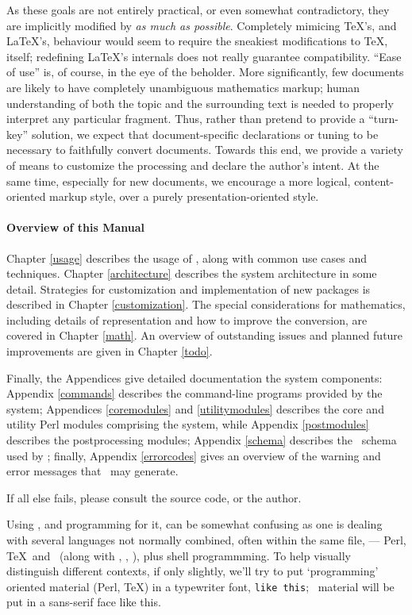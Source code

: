 \documentclass{book}
\begin{document}
As these goals are not entirely practical, or even somewhat contradictory,
they are implicitly modified by \emph{as much as possible}.
Completely mimicing \TeX's, and \LaTeX's, behaviour would seem to require the
sneakiest modifications to \TeX, itself; redefining \LaTeX's internals does 
not really guarantee compatibility. ``Ease of use'' is, of course, in the eye of the beholder.
More significantly, few documents are likely to have completely unambiguous
mathematics markup; human understanding of both the topic and the surrounding 
text is needed to properly interpret any particular fragment.
Thus, rather than pretend to provide a ``turn-key'' solution,
we expect that document-specific declarations or tuning to be necessary
to faithfully convert documents.  Towards this end, we provide a variety
of means to customize the processing and declare the author's intent.
At the same time, especially for new documents, we encourage a more logical, 
content-oriented markup style, over a purely presentation-oriented style.

\paragraph[Overview]{Overview of this Manual}
Chapter \ref{usage} describes the usage of \LaTeXML, along with
common use cases and techniques.  Chapter \ref{architecture} describes
the system architecture in some detail. Strategies for customization
and implementation of new packages is described in Chapter \ref{customization}.
The special considerations for mathematics, including details of representation
and how to improve the conversion, are covered in Chapter \ref{math}.
An overview of outstanding issues and planned future improvements
are given in Chapter \ref{todo}.

Finally, the Appendices give detailed documentation the system components:
Appendix \ref{commands} describes the command-line programs provided by the system;
Appendices \ref{coremodules} and \ref{utilitymodules} describes the core and utility Perl modules 
comprising the system, while Appendix \ref{postmodules} describes the postprocessing modules;
Appendix \ref{schema} describes the \XML\ schema used by \LaTeXML;
finally, Appendix \ref{errorcodes} gives an overview of the warning and
error messages that \LaTeXML\ may generate.

If all else fails, please consult the source code, or the author.

\vskip 1cm\relax
Using \LaTeXML, and programming for it, can be somewhat confusing as one is dealing with several
languages not normally combined, often within the same file,
--- Perl, \TeX\ and \XML\ (along with \XSLT, \HTML, \CSS), plus shell programmming.
To help visually distinguish different contexts, if only slightly,
we'll try to put `programming' oriented material (Perl, \TeX) in a typewriter font,
\texttt{like this}; \XML\ material will be put in a sans-serif face
\textsf{like this}.
\end{document}
